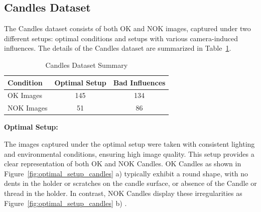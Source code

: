 \documentclass[12pt,DIV14,BCOR12mm,a4paper,footinclude=false,headinclude,parskip=half-,twoside,openright,cleardoublepage=empty,toc=index,bibliography=totoc,listof=totoc]{scrreprt}
\numberwithin{equation}{chapter}
\begin{document}
\subsection{Candles Dataset}
\label{sec:candles_dataset}
The Candles dataset consists of both OK and NOK images, captured under two different setups: optimal conditions and setups with various camera-induced influences. The details of the Candles dataset are summarized in Table~\ref{tab:candles-dataset}.

\begin{table}
    \centering
    \caption{Candles Dataset Summary}
    \label{tab:candles-dataset}
    \begin{tabular}{lcc}
        \toprule
        \textbf{Condition} & \textbf{Optimal Setup} & \textbf{Bad Influences} \\ 
        \midrule
        OK Images          & 145                    & 134                     \\ 
        NOK Images         & 51                     & 86                      \\ 
        \bottomrule
    \end{tabular}
\end{table}



\textbf{Optimal Setup:}

The images captured under the optimal setup were taken with consistent lighting and environmental conditions, ensuring high image quality. This setup provides a clear representation of both OK and NOK Candles. OK Candles as shown in Figure~\ref{fig:optimal_setup_candles} a) typically exhibit a round shape, with no dents in the holder or scratches on the candle surface, or absence of the Candle or thread in the holder. In contrast, NOK Candles display these irregularities as Figure~\ref{fig:optimal_setup_candles} b) .
\end{document}
